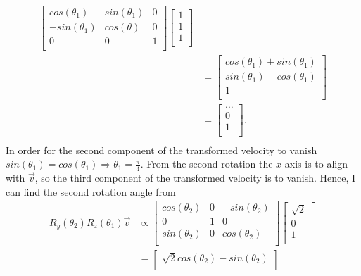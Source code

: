 \begin{example}
\begin{enumerate}
\begin{equation}
\begin{split}
\begin{bmatrix}
					cos(\theta_1) & sin(\theta_1) & 0 \\
					-sin(\theta_1) & cos(\theta) & 0 \\
					0 & 0 & 1 \\
				\end{bmatrix}\begin{bmatrix}
					1\\
					1\\
					1\\
				\end{bmatrix}\\
				&=\begin{bmatrix}
					cos(\theta_1)+sin(\theta_1)\\
					sin(\theta_1)-cos(\theta_1)\\
					1\\
				\end{bmatrix}\\
				&= \begin{bmatrix}
					\dots\\
					0\\
					1\\
				\end{bmatrix}.\\
			\end{split}
		\end{equation} 
		In order for the second component of the transformed velocity to vanish $sin(\theta_1)=cos(\theta_1)\Rightarrow \theta_1=\frac{\pi}{4}$. From the second rotation the $x$-axis is to align with $\vec{v}$, so the third component of the transformed velocity is to vanish. Hence, I can find the second rotation angle from
		\begin{equation}
			\begin{split}
				R_y(\theta_2)R_z(\theta_1)\vec{v}&\propto
				\begin{bmatrix}
					cos(\theta_2) & 0 & -sin(\theta_2) \\
					0 & 1 & 0 \\
					sin(\theta_2) & 0 & cos(\theta_2) \\
				\end{bmatrix}\begin{bmatrix}
					\sqrt{2}\\
					0\\
					1\\
				\end{bmatrix}\\
				&=\begin{bmatrix}
					\sqrt{2}cos(\theta_2)-sin(\theta_2)\\

\end{bmatrix}
\end{split}
\end{equation}
\end{enumerate}
\end{example}
